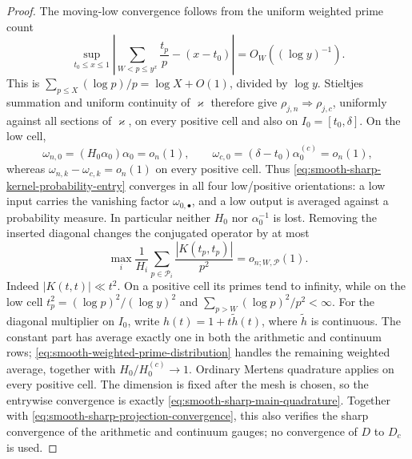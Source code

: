 \documentclass[11pt]{article}
\numberwithin{equation}{section}
\theoremstyle{definition}
\theoremstyle{remark}
\newcommand{\1}{\mathbf 1}
\begin{document}
\begin{proof}
The moving-low convergence follows from the uniform weighted prime
count
\begin{equation}
 \sup_{t_0\leq x\leq1}\left|
 \sum_{W<p\leq y^x}\frac{t_p}{p}-(x-t_0)\right|
 =O_W((\log y)^{-1}).
 \label{eq:smooth-weighted-prime-distribution}
\end{equation}
This is
\(\sum_{p\leq X}(\log p)/p=\log X+O(1)\), divided by
\(\log y\).  Stieltjes summation and uniform continuity of
\(\varkappa\) therefore give
\(\rho_{j,n}\Rightarrow\rho_{j,c}\), uniformly against all sections of
\(\varkappa\), on every positive cell and also on
\(I_0=[t_0,\delta]\).  On the low cell,
\[
 \omega_{n,0}=(H_0\alpha_0)\alpha_0=o_n(1),\qquad
 \omega_{c,0}=(\delta-t_0)\alpha_0^{(c)}=o_n(1),
\]
whereas \(\omega_{n,k}-\omega_{c,k}=o_n(1)\) on every positive cell.
Thus \eqref{eq:smooth-sharp-kernel-probability-entry} converges in all
four low/positive orientations: a low input carries the vanishing
factor \(\omega_{0,\bullet}\), and a low output is averaged against a
probability measure.  In particular neither \(H_0\) nor
\(\alpha_0^{-1}\) is lost.
Removing the inserted diagonal changes the conjugated operator by at
most
\[
 \max_i\frac1{H_i}\sum_{p\in\mathcal P_i}
       \frac{|K(t_p,t_p)|}{p^2}=o_{n;W,\mathcal P}(1).
\]
Indeed \(|K(t,t)|\ll t^2\).  On a positive cell its primes tend to
infinity, while on the low cell
\(t_p^2=(\log p)^2/(\log y)^2\) and
\(\sum_{p>W}(\log p)^2/p^2<\infty\).
For the diagonal multiplier on \(I_0\), write
\(h(t)=1+t\widetilde h(t)\), where \(\widetilde h\) is continuous.
The constant part has average exactly one in both the arithmetic and
continuum rows; \eqref{eq:smooth-weighted-prime-distribution} handles
the remaining weighted average, together with
\(H_0/H_0^{(c)}\to1\).  Ordinary Mertens quadrature applies on every
positive cell.  The dimension is fixed after the mesh is chosen, so the
entrywise convergence is exactly
\eqref{eq:smooth-sharp-main-quadrature}.  Together with
\eqref{eq:smooth-sharp-projection-convergence}, this also verifies the
sharp convergence of the arithmetic and continuum gauges; no
convergence of \(D\) to \(D_c\) is used.


\end{proof}
\end{document}
